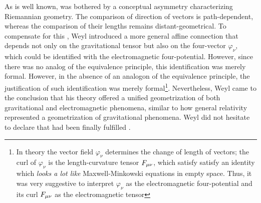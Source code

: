 \documentclass[final]{article}
\newcommand{\phin}{\ensuremath{\varphi_\nu}\xspace}
\renewcommand{\fmn}{\ensuremath{F\mn}\xspace}
\begin{document}
As is well known, \citet{Weyl1918b,Weyl1918a,Weyl1919a} was bothered by a conceptual asymmetry characterizing Riemannian geometry. The comparison of direction of vectors is path-dependent, whereas the comparison of their lengths remains distant-geometrical. To compensate for this  \citep{Afriat2009}, Weyl introduced a more general affine connection that depends not only on the gravitational tensor \gmn but also on the four-vector \phin, which could be identified with the electromagnetic four-potential. However, since there was no analog of the equivalence principle, this identification was merely formal. However, in the absence of an analogon of the equivalence principle, the justification of such identification was merely formal\footnote{In  theory the vector field \phin determines the change of length of vectors;  the curl of \phin is the length-curvature tensor \fmn, which satisfy satisfy an identity which \emph{looks a lot like} Maxwell-Minkowski equations in empty space. Thus, it was very suggestive to interpret \phin as the electromagnetic four-potential and its curl \fmn as the electromagnetic tensor}. Nevertheless, Weyl came to the conclusion that his theory offered a unified geometrization of both gravitational and electromagnetic phenomena, similar to how general relativity represented a geometrization of gravitational phenomena. Weyl did not hesitate to declare that  had been finally fulfilled \citep[263]{Weyl1919}.
\end{document}
